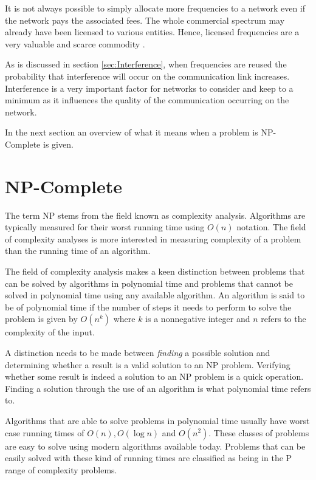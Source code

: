 It is not always possible to simply allocate more frequencies to a network even if the network pays the associated fees. The whole commercial spectrum may already have been licensed to various entities. Hence, licensed frequencies are a very valuable and scarce commodity \cite{FAPRAMColouring,FAPInCell}.

As is discussed in section \ref{sec:Interference}, when frequencies are reused the probability that interference will occur on the communication link increases. Interference is a very important factor for networks to consider and keep to a minimum as it influences the quality of the communication occurring on the network.

In the next section an overview of what it means when a problem is NP-Complete is given.

\section{NP-Complete}
\label{sec:NPComplete}
The term NP stems from the field known as complexity analysis. Algorithms are typically measured for their worst running time using $O(n)$ notation. The field of complexity analyses is more interested in measuring complexity of a problem than the running time of an algorithm\cite{AIModernApproach}.

The field of complexity analysis makes a keen distinction between problems that can be solved by algorithms in polynomial time and problems that cannot be solved in polynomial time using any available algorithm\cite{AIModernApproach}. An algorithm is said to be of polynomial time if the number of steps it needs to perform to solve the problem is given by $O(n^k)$ where $k$ is a nonnegative integer and $n$ refers to the complexity of the input\cite{AIModernApproach}.

A distinction needs to be made between \emph{finding} a possible solution and determining whether a result is a valid solution to an NP problem\cite{AIModernApproach}. Verifying whether some result is indeed a solution to an NP problem is a quick operation\cite{AIModernApproach}. Finding a solution through the use of an algorithm is what polynomial time refers to.

Algorithms that are able to solve problems in polynomial time usually have worst case running times of $O(n),O(\log n)$ and $O(n^2)$\cite{AIModernApproach}. These classes of problems are easy to solve using modern algorithms available today. Problems that can be easily solved with these kind of running times are classified as being in the P range of complexity problems\cite{AIModernApproach}.

